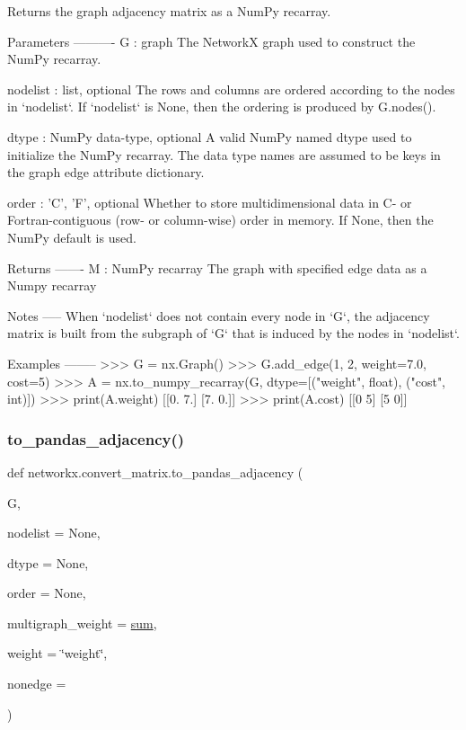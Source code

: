 \begin{DoxyVerb}Returns the graph adjacency matrix as a NumPy recarray.

Parameters
----------
G : graph
    The NetworkX graph used to construct the NumPy recarray.

nodelist : list, optional
   The rows and columns are ordered according to the nodes in `nodelist`.
   If `nodelist` is None, then the ordering is produced by G.nodes().

dtype : NumPy data-type, optional
    A valid NumPy named dtype used to initialize the NumPy recarray.
    The data type names are assumed to be keys in the graph edge attribute
    dictionary.

order : {'C', 'F'}, optional
    Whether to store multidimensional data in C- or Fortran-contiguous
    (row- or column-wise) order in memory. If None, then the NumPy default
    is used.

Returns
-------
M : NumPy recarray
   The graph with specified edge data as a Numpy recarray

Notes
-----
When `nodelist` does not contain every node in `G`, the adjacency
matrix is built from the subgraph of `G` that is induced by the nodes in
`nodelist`.

Examples
--------
>>> G = nx.Graph()
>>> G.add_edge(1, 2, weight=7.0, cost=5)
>>> A = nx.to_numpy_recarray(G, dtype=[("weight", float), ("cost", int)])
>>> print(A.weight)
[[0. 7.]
 [7. 0.]]
>>> print(A.cost)
[[0 5]
 [5 0]]\end{DoxyVerb}
 \mbox{\label{namespacenetworkx_1_1convert__matrix_a0153ce03fb37943dab6046e07b4bffc0}} 
\subsubsection{\texorpdfstring{to\+\_\+pandas\+\_\+adjacency()}{to\_pandas\_adjacency()}}
{\footnotesize\ttfamily def networkx.\+convert\+\_\+matrix.\+to\+\_\+pandas\+\_\+adjacency (\begin{DoxyParamCaption}\item[{}]{G,  }\item[{}]{nodelist = {\ttfamily None},  }\item[{}]{dtype = {\ttfamily None},  }\item[{}]{order = {\ttfamily None},  }\item[{}]{multigraph\+\_\+weight = {\ttfamily \hyperlink{assumed__shape_2foo__free_8f90_a1c860bb40bf43c289bc16f8634733f9a}{sum}},  }\item[{}]{weight = {\ttfamily \char`\"{}weight\char`\"{}},  }\item[{}]{nonedge = {} }\end{DoxyParamCaption})}

